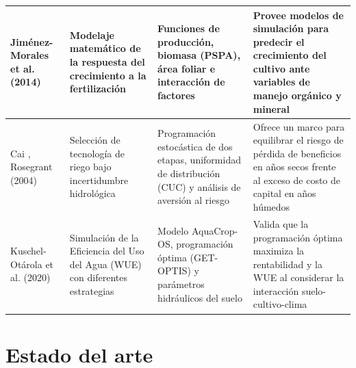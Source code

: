 \documentclass[12pt]{report}
\begin{document}
\begin{longtable}{p{3cm} p{3cm} p{5cm} p{4cm}}
Jiménez-Morales et al. (2014) & Modelaje matemático de la respuesta del crecimiento a la fertilización & Funciones de producción, biomasa (PSPA), área foliar e interacción de factores & Provee modelos de simulación para predecir el crecimiento del cultivo ante variables de manejo orgánico y mineral\\ \hline

Cai , Rosegrant (2004) & Selección de tecnología de riego bajo incertidumbre hidrológica & Programación estocástica de dos etapas, uniformidad de distribución (CUC) y análisis de aversión al riesgo & Ofrece un marco para equilibrar el riesgo de pérdida de beneficios en años secos frente al exceso de costo de capital en años húmedos\\\hline

Kuschel-Otárola et al. (2020) & Simulación de la Eficiencia del Uso del Agua (WUE) con diferentes estrategias & Modelo AquaCrop-OS, programación óptima (GET-OPTIS) y parámetros hidráulicos del suelo & Valida que la programación óptima maximiza la rentabilidad y la WUE al considerar la interacción suelo-cultivo-clima\\\hline




\end{longtable}




\newpage
\section{Estado del arte}
\end{document}
